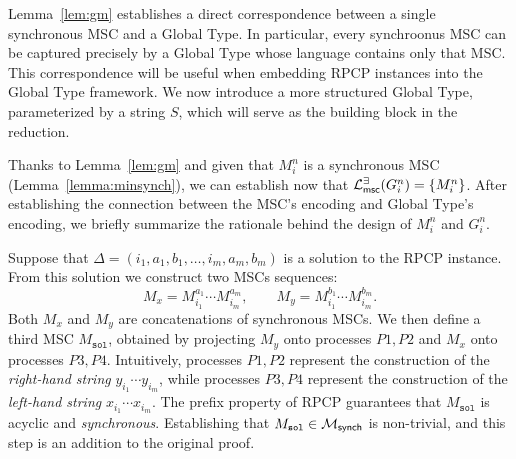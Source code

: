 Lemma~\ref{lem:gm} establishes a direct correspondence between a  
single synchronous MSC and a Global Type. In particular, every  
synchroonus MSC can be captured precisely by a Global Type whose  
language contains only that MSC. This correspondence will be useful  
when embedding RPCP instances into the Global Type framework.
We now introduce a more structured Global Type, parameterized by a  
string $S$, which will serve as the building block in the reduction.

Thanks to Lemma~\ref{lem:gm} and given that $M_i^n$
is a synchronous MSC (Lemma~\ref{lemma:minsynch}), 
we can establish now that 
$\mathcal{L}_{\mathsf{msc}}^{\exists}(G_i^n) =\{M_i^n\}$.
After establishing the connection between the MSC's encoding and
Global Type's encoding,
we briefly summarize the rationale behind the design of $M_i^n$ and $G_i^n$.

Suppose that $\Delta=(i_1,a_1,b_1,\ldots,i_m,a_m,b_m)$ is a  
solution to the RPCP instance. From this solution we construct   
two MSCs sequences:
\[
M_x = M^{a_1}_{i_1}\cdots M^{a_m}_{i_m}, \qquad  
M_y = M^{b_1}_{i_1}\cdots M^{b_m}_{i_m}.
\]
Both $M_x$ and $M_y$ are concatenations of synchronous  
MSCs. We then define a third MSC $M_{\texttt{sol}}$, obtained by  
projecting $M_y$ onto processes $P1,P2$ and $M_x$ onto processes  
$P3,P4$. Intuitively, processes $P1,P2$ represent the construction of  
the \emph{right-hand string} $y_{i_1}\cdots y_{i_m}$, while processes  
$P3,P4$ represent the construction of the \emph{left-hand string}  
$x_{i_1}\cdots x_{i_m}$. The prefix property of RPCP guarantees that  
$M_{\texttt{sol}}$ is acyclic and \emph{synchronous}. Establishing that 
$M_{\texttt{sol}} \in \mathcal{M}_{\mathsf{synch}}$ is non-trivial, and this 
step is an addition to the original proof. 





